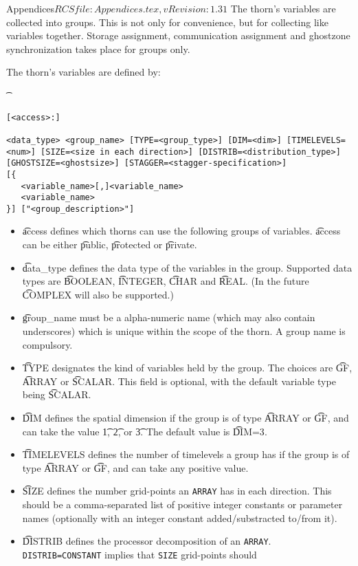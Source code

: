 \begin{cactuspart}{6}{Appendices}{$RCSfile: Appendices.tex,v $}{$Revision: 1.31 $}
The thorn's variables are collected into groups. This is not only
for convenience, but for collecting like variables together.
Storage assignment, communication assignment and ghostzone synchronization
takes place for groups only.


The thorn's variables are defined by:
{\t
\begin{verbatim}
[<access>:]

<data_type> <group_name> [TYPE=<group_type>] [DIM=<dim>] [TIMELEVELS=<num>] [SIZE=<size in each direction>] [DISTRIB=<distribution_type>] [GHOSTSIZE=<ghostsize>] [STAGGER=<stagger-specification>]
[{
   <variable_name>[,]<variable_name>
   <variable_name>
}] ["<group_description>"]
\end{verbatim}}

\begin{itemize}
\item{} {\t access} defines which thorns can use the following
        groups of variables. {\t access} can be either
        {\t public}, {\t protected} or {\t private}.
\item{} {\t data\_type} defines the data type of the variables in the group.
Supported data types are {\t BOOLEAN}, {\t INTEGER}, {\t CHAR} and {\t REAL}.
(In the future {\t COMPLEX} will also be supported.)
\item{} {\t group\_name} must be a alpha-numeric name (which may also
contain underscores) which is unique
within the scope of the thorn. A group name is compulsory.
\item{} {\t TYPE} designates the kind of variables held by the group.
The choices are {\t GF}, {\t ARRAY} or {\t SCALAR}. This field is
optional, with the default variable type being {\t SCALAR}.
\item{} {\t DIM} defines the spatial dimension if the group is
	of type {\t ARRAY} or {\t GF}, and can take the value
	{\t 1}, {\t 2}, or {\t 3}.
The default value is {\t DIM=3}.
\item{} {\t TIMELEVELS} defines the number of timelevels a group has if
        the group is of type {\t ARRAY} or {\t GF}, and can take any positive
        value.
\item{} {\t SIZE} defines the number grid-points an {\tt ARRAY} has in each direction.
        This should be a comma-separated list of positive integer constants or parameter names (optionally with an integer constant added/substracted to/from it).
\item{} {\t DISTRIB} defines the processor decomposition of an {\tt ARRAY}.
        {\tt DISTRIB=CONSTANT} implies that {\tt SIZE} grid-points should

\end{itemize}
\end{cactuspart}
